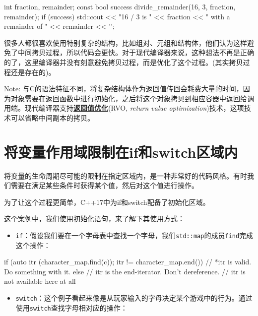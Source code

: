\begin{codebox}[cpp]
int fraction, remainder;
const bool success {divide_remainder(16, 3, fraction, remainder)};
if (success) {
  std::cout << "16 / 3 is " << fraction << " with a remainder of "
            << remainder << '\n';
}
\end{codebox}

很多人都很喜欢使用特别复杂的结构，比如组对、元组和结构体，他们认为这样避免了中间拷贝过程，所以代码会更快。对于现代编译器来说，这种想法不再是正确的了，这里编译器并没有刻意避免拷贝过程，而是优化了这个过程。(其实拷贝过程还是存在的)。

\begin{myInfoBox}
Note: 与C的语法特征不同，将复杂结构体作为返回值传回会耗费大量的时间，因为对象需要在返回函数中进行初始化，之后将这个对象拷贝到相应容器中返回给调用端。现代编译器支持\textbf{\href{https://zh.wikipedia.org/wiki/\%E8\%BF\%94\%E5\%9B\%9E\%E5\%80\%BC\%E4\%BC\%98\%E5\%8C\%96}{返回值优化}}(RVO, \emph{return value optimization})技术，这项技术可以省略中间副本的拷贝。
\end{myInfoBox}


\section{将变量作用域限制在if和switch区域内}

将变量的生命周期尽可能的限制在指定区域内，是一种非常好的代码风格。有时我们需要在满足某些条件时获得某个值，然后对这个值进行操作。

为了让这个过程更简单，C++17中为if和switch配备了初始化区域。


这个案例中，我们使用初始化语句，来了解下其使用方式：

\begin{itemize}
\item \texttt{if}：假设我们要在一个字母表中查找一个字母，我们\texttt{std::map}的成员\texttt{find}完成这个操作：

\end{itemize}

\begin{codebox}[cpp]
if (auto itr (character_map.find(c)); itr != character_map.end()) {
  // *itr is valid. Do something with it.
} else {
  // itr is the end-iterator. Don't dereference.
}
// itr is not available here at all
\end{codebox}

\begin{itemize}
\item \texttt{switch}：这个例子看起来像是从玩家输入的字母决定某个游戏中的行为。通过使用\texttt{switch}查找字母相对应的操作：

\end{itemize}


